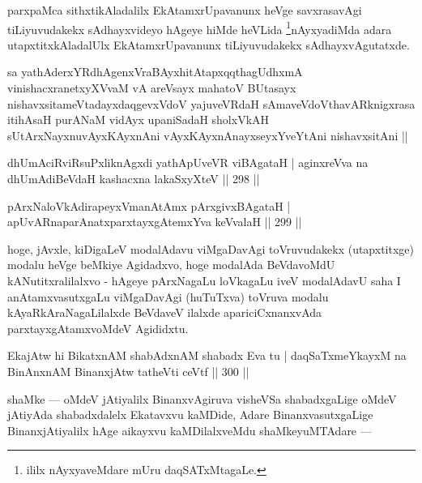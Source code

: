 \begin{artha}
parxpaMca sithxtikAladalilx EkAtamxrUpavanunx heVge savxrasavAgi tiLiyuvudakekx sAdhayxvideyo hAgeye hiMde heVLida \footnote[1]{ililx nAyxyaveMdare mUru daqSATxMtagaLe.}nAyxyadiMda adara utapxtitxkAladalUlx EkAtamxrUpavanunx tiLiyuvudakekx sAdhayxvAgutatxde.
\end{artha}


\begin{shl}
sa yathAderxYRdhAgenxVraBAyxhitAtapxqqthagUdhxmA vinishacxranetxyXVvaM vA areV\s sayx mahatoV BUtasayx nishavxsitameVtadayxdaqgevxVdoV yajuveVRdaH sAmaveVdoV\s thavARknigxrasa itihAsaH purANaM vidAyx upaniSadaH sholxVkAH sUtArxNayxnuvAyxKAyxnAni vAyxKAyxnAnayxseyxYveYtAni nishavxsitAni ||
\end{shl}

\begin{shl}
dhUmAciRviRsuPxliknAgxdi yathApUveVR viBAgataH |
aginxreVva na dhUmAdiBeVdaH kashacxna lakaSxyXteV \hfill || 298 ||
\end{shl}

\begin{shl}
pArxNaloVkAdirapeyxVmanAtAmx pArxgivxBAgataH |
apUvARnaparAnatxparxtayxgAtemxYva keVvalaH \hfill || 299 ||
\end{shl}

\begin{artha}
hoge, jAvxle, kiDigaLeV modalAdavu viMgaDavAgi toVruvudakekx (utapxtitxge) modalu heVge beMkiye Agidadxvo, hoge modalAda BeVdavoMdU kANutitxralilalxvo - hAgeye pArxNagaLu loVkagaLu iveV modalAdavU saha I anAtamxvasutxgaLu viMgaDavAgi (huTuTxva) toVruva modalu kAyaRkAraNagaLilalxde BeVdaveV ilalxde apariciCxnanxvAda parxtayxgAtamxvoMdeV Agididxtu.
\end{artha}

\begin{shl}
EkajAtw hi BikatxnAM shabAdxnAM shabadx Eva tu |
daqSaTxmeYkayxM na BinAnxnAM BinanxjAtw tatheVti ceVtf \hfill || 300 ||
\end{shl}

\begin{artha}
shaMke  {\rm ---}  oMdeV jAtiyalilx BinanxvAgiruva visheVSa shabadxgaLige oMdeV jAtiyAda shabadxdalelx Ekatavxvu kaMDide, Adare BinanxvasutxgaLige BinanxjAtiyalilx hAge aikayxvu kaMDilalxveMdu shaMkeyuMTAdare  {\rm ---} 
\end{artha}


